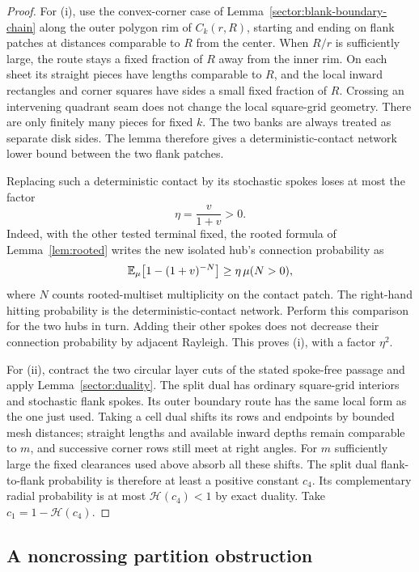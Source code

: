 \begin{proof}
For (i), use the convex-corner case of
Lemma~\ref{sector:blank-boundary-chain} along the outer polygon rim of
$C_k(r,R)$,
starting and ending on flank patches at distances comparable to $R$
from the center.  When $R/r$ is sufficiently large, the route stays a
fixed fraction of $R$ away from the inner rim.  On each sheet its
straight pieces have lengths comparable to $R$, and the local inward
rectangles and corner squares have sides a small fixed fraction of
$R$.  Crossing an intervening quadrant seam does not change the local
square-grid geometry.  There are only finitely many pieces for fixed
$k$.  The two banks are always treated as separate disk sides.
The lemma therefore gives a deterministic-contact network lower bound
between the two flank patches.

Replacing such a deterministic contact by its stochastic spokes loses
at most the factor
\[
 \eta=\frac{v}{1+v}>0.
\]
Indeed, with the other tested terminal fixed, the rooted formula of
Lemma~\ref{lem:rooted} writes the new isolated hub's connection
probability as
\[
 \mathbb E_\mu\bigl[1-(1+v)^{-N}\bigr]
 \geq \eta\,\mu(N>0),
\]
where $N$ counts rooted-multiset multiplicity on the contact patch.
The right-hand hitting probability is the deterministic-contact
network.  Perform this comparison for the two hubs in turn.  Adding
their other spokes does not decrease their connection probability by
adjacent Rayleigh.  This proves (i), with a factor $\eta^2$.

For (ii), contract the two circular layer cuts of the stated
spoke-free passage and apply Lemma~\ref{sector:duality}.  The split
dual has ordinary square-grid interiors and stochastic flank spokes.
Its outer boundary route has the same local form as the one just
used.  Taking a cell dual shifts its rows and endpoints by bounded
mesh distances; straight lengths and available inward depths remain
comparable to $m$, and successive corner rows still meet at right
angles.  For $m$ sufficiently large the fixed clearances used above
absorb all these shifts.  The split dual flank-to-flank probability
is therefore at least a positive constant $c_4$.  Its complementary
radial probability is at most $\mathcal H(c_4)<1$ by exact duality.
Take $c_1=1-\mathcal H(c_4)$.
\end{proof}

\subsection{A noncrossing partition obstruction}
\label{sector:partition-obstruction}

